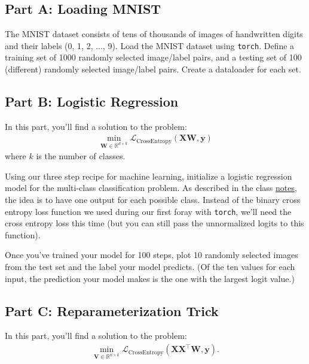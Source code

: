 \documentclass{article}
\begin{document}
\subsection*{Part A: Loading MNIST}

The MNIST dataset consists of tens of thousands of images of handwritten digits and their labels (0, 1, 2, ..., 9).
Load the MNIST dataset using \texttt{torch}.
Define a training set of 1000 randomly selected image/label pairs, and a testing set of 100 (different) randomly selected image/label pairs.
Create a dataloader for each set.

\subsection*{Part B: Logistic Regression}

In this part, you'll find a solution to the problem:
\begin{align}
    \min_{\mathbf{W} \in \mathbb{R}^{d \times k}}
    \mathcal{L}_{\text{CrossEntropy}}
    (\mathbf{XW}, \mathbf{y})
\end{align}
where $k$ is the number of classes.

Using our three step recipe for machine learning, initialize a logistic regression model for the multi-class classification problem.
As described in the class \href{https://www.rtealwitter.com/datamining2025/notes/LogisticRegression.html#multiple-classes}{notes}, the idea is to have one output for each possible class.
Instead of the binary cross entropy loss function we used during our first foray with \texttt{torch},
we'll need the cross entropy loss this time (but you can still pass the unnormalized logits to this function).

Once you've trained your model for 100 steps, plot 10 randomly selected images from the test set and the label your model predicts.
(Of the ten values for each input, the prediction your model makes is the one with the largest logit value.)

\subsection*{Part C: Reparameterization Trick}

In this part, you'll find a solution to the problem:
\begin{align}
    \min_{\mathbf{V} \in \mathbb{R}^{n \times k}}
    \mathcal{L}_{\text{CrossEntropy}}
    (\mathbf{XX^\top W}, \mathbf{y}).
\end{align}
\end{document}

